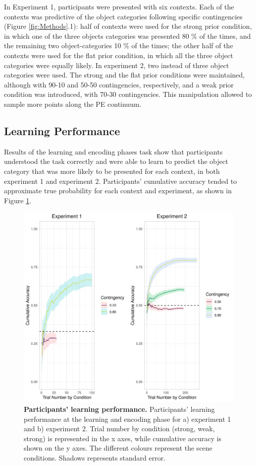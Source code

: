 \documentclass[a4paper,12pt]{article} 			%
\begin{document}
In Experiment 1, participants were presented with six contexts. Each of the contexts was predictive of the object categories following specific contingencies (Figure \ref{fig:Methods}.1): half of contexts were used for the strong prior condition, in which one of the three objects categories was presented 80 \% of the times, and the remaining two object-categories 10 \% of the times; the other half of the contexts were used for the flat prior condition, in which all the three object categories were equally likely. In experiment 2, two instead of three object categories were used. The strong and the flat prior conditions were maintained, although with 90-10 and 50-50 contingencies, respectively, and a weak prior condition was introduced, with 70-30 contingencies. This manipulation allowed to sample more points along the PE continuum.

\subsection{Learning Performance}
Results of the learning and encoding phases task show that participants understood the task correctly and were able to learn to predict the object category that was more likely to be presented for each context, in both experiment 1 and experiment 2. Participants’ cumulative accuracy tended to approximate true probability for each context and experiment, as shown in Figure \ref{fig:participantsLer}.


\begin{figure}[ht!]
\centerline
{\includegraphics[width=1\textwidth]{figures/cumAccbySceneAll.jpg}}
\caption{\textbf{Participants' learning performance.} Participants' learning performance at the learning and encoding phase for a) experiment 1 and b) experiment 2. Trial number by condition (strong, weak, strong) is represented in the x axes, while cumulative accuracy is shown on the y axes. The different colours represent the scene conditions. Shadows represents standard error.}
\label{fig:participantsLer}
\end{figure}
\end{document}
